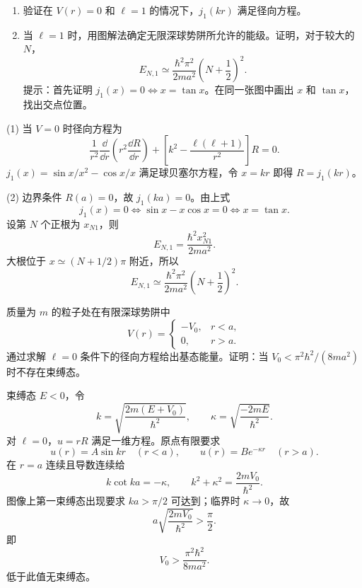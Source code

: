 \begin{question}
\begin{enumerate}
\item 验证在 $V(r)=0$ 和 $\ell=1$ 的情况下，$j_1(kr)$ 满足径向方程。
\item 当 $\ell=1$ 时，用图解法确定无限深球势阱所允许的能级。证明，对于较大的 $N$，
\[
E_{N,1}\simeq \frac{\hbar^2\pi^2}{2ma^2}\left(N+\frac12\right)^2.
\]
提示：首先证明 $j_1(x)=0 \Leftrightarrow x=\tan x$。在同一张图中画出 $x$ 和 $\tan x$，找出交点位置。
\end{enumerate}
\end{question}
\begin{solution}

(1) 当 $V=0$ 时径向方程为
\[
\frac{1}{r^2}\frac{\dd}{\dd r}\left(r^2\frac{\dd R}{\dd r}\right)+\left[k^2-\frac{\ell(\ell+1)}{r^2}\right]R=0.
\]
$j_1(x)=\sin x/x^2-\cos x/x$ 满足球贝塞尔方程，令 $x=kr$ 即得 $R=j_1(kr)$。

(2) 边界条件 $R(a)=0$，故 $j_1(ka)=0$。由上式
\[
j_1(x)=0\iff \sin x-x\cos x=0\iff x=\tan x.
\]
设第 $N$ 个正根为 $x_{N1}$，则
\[
E_{N,1}=\frac{\hbar^2x_{N1}^2}{2ma^2}.
\]
大根位于 $x\simeq (N+1/2)\pi$ 附近，所以
\[
E_{N,1}\simeq\frac{\hbar^2\pi^2}{2ma^2}\left(N+\frac12\right)^2.
\]

\end{solution}

\begin{question}
质量为 $m$ 的粒子处在有限深球势阱中
\[
V(r)=\begin{cases}
-V_0, & r<a,\\
0, & r>a.
\end{cases}
\]
通过求解 $\ell=0$ 条件下的径向方程给出基态能量。证明：当 $V_0<\pi^2\hbar^2/(8ma^2)$ 时不存在束缚态。
\end{question}
\begin{solution}

束缚态 $E<0$，令
\[
k=\sqrt{\frac{2m(E+V_0)}{\hbar^2}},\qquad \kappa=\sqrt{\frac{-2mE}{\hbar^2}}.
\]
对 $\ell=0$，$u=rR$ 满足一维方程。原点有限要求
\[
u(r)=A\sin kr\quad (r<a),
\qquad u(r)=Be^{-\kappa r}\quad (r>a).
\]
在 $r=a$ 连续且导数连续给
\[
k\cot ka=-\kappa,
\qquad k^2+\kappa^2=\frac{2mV_0}{\hbar^2}.
\]
图像上第一束缚态出现要求 $ka>\pi/2$ 可达到；临界时 $\kappa\to0$，故
\[
a\sqrt{\frac{2mV_0}{\hbar^2}}>\frac{\pi}{2}.
\]
即
\[
V_0>\frac{\pi^2\hbar^2}{8ma^2}.
\]
低于此值无束缚态。

\end{solution}

